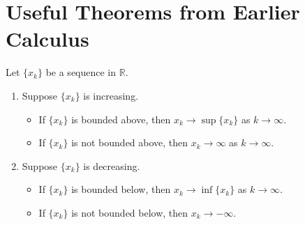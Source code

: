\documentclass[notoc,notitlepage]{tufte-book}
\begin{document}



\appendix

\chapter{Useful Theorems from Earlier Calculus}%
\label{chp:useful_theorems_from_earlier_calculus}

\begin{thm}\label{thm:monotone_convergence_theorem}
  Let $\{x_k\}$ be a sequence in $\mathbb{R}$.
  \begin{enumerate}
    \item Suppose $\{x_k\}$ is increasing.
      \begin{itemize}
        \item If $\{ x_k \}$ is bounded above, then $x_k \to \sup \{ x_k \}$ as $k \to \infty$.
        \item If $\{ x_k \}$ is not bounded above, then $x_k \to \infty$ as $k \to \infty$.
      \end{itemize}
    \item Suppose $\{ x_k \}$ is decreasing.
      \begin{itemize}
        \item If $\{ x_k \}$ is bounded below, then $x_k \to \inf \{ x_k \}$ as $k \to \infty$.
        \item If $\{ x_k \}$ is not bounded below, then $x_k \to -\infty$.
      \end{itemize}
  \end{enumerate}
\end{thm}


\backmatter\

\pagestyle{plain}



\printindex

\listoftodos
\end{document}
